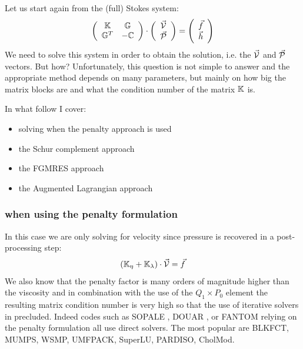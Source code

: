 
Let us start again from the (full) Stokes system:
\begin{equation}
\left(
\begin{array}{cc}
{\mathbb{K}} & {\mathbb{G}} \\ {\mathbb{G}}^T & -{\mathbb{C}} 
\end{array}
\right)
\cdot
\left(
\begin{array}{c}
\vec{\cal V} \\ \vec{\cal P}
\end{array}
\right)
=
\left(
\begin{array}{c}
\vec{f} \\ \vec{h}
\end{array}
\right)
\label{StokesSyst}
\end{equation}
We need to solve this system in order to obtain the solution, i.e. the $\vec{\cal V}$ 
and $\vec{\cal P}$ vectors. But how? 
Unfortunately, this question is not simple to answer and the appropriate method depends on many 
parameters, but mainly on how big the matrix blocks are and what the condition number of the matrix ${\mathbb{K}}$ is. 

In what follow I cover:
\begin{itemize}
\item solving when the penalty approach is used
\item the Schur complement approach
\item the FGMRES approach
\item the Augmented Lagrangian approach
\end{itemize}

\subsubsection{when using the penalty formulation}

In this case we are only solving for 
velocity since pressure is recovered in a post-processing step:
\[
({\mathbb{K}}_\eta+{\mathbb{K}}_\lambda) \cdot \vec {\cal V} = \vec f
\]
 We also know that 
the penalty factor is many orders of magnitude higher than the viscosity and 
in combination with the use of the $Q_1 \times P_0$ element the resulting matrix 
condition number is very high so that the use of iterative solvers in precluded. 
Indeed codes such as SOPALE \cite{full95}, DOUAR \cite{brtf08}, or FANTOM \cite{thie11} 
relying on the penalty formulation all use direct solvers.
The most popular are BLKFCT, MUMPS, WSMP, UMFPACK, SuperLU, PARDISO, CholMod. 

